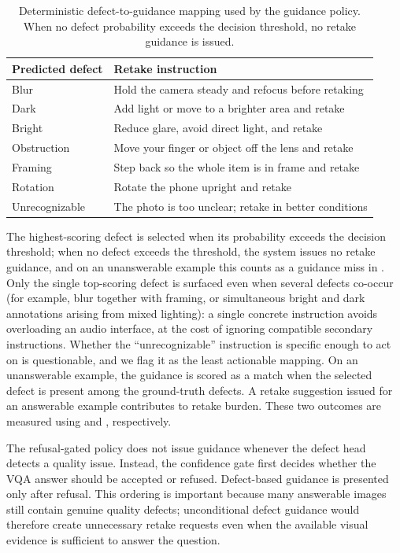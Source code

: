 \documentclass{ieeeaccess}
\newcommand{\arr}{\mathrm{GDMR}}
\newcommand{\frr}{\mathrm{AIRB}}
\begin{document}
\begin{table}[t]
    \centering
    \caption{Deterministic defect-to-guidance mapping used by the
    guidance policy. When no defect probability exceeds the
    decision threshold, no retake guidance is issued.}
    \label{tab:defect_guidance}
    \small
    \begin{tabular}{ll}
        \toprule
        Predicted defect & Retake instruction \\
        \midrule
        Blur & Hold the camera steady and refocus before retaking \\
        Dark & Add light or move to a brighter area and retake \\
        Bright & Reduce glare, avoid direct light, and retake \\
        Obstruction & Move your finger or object off the lens and retake \\
        Framing & Step back so the whole item is in frame and retake \\
        Rotation & Rotate the phone upright and retake \\
        Unrecognizable & The photo is too unclear; retake in better conditions \\
        \bottomrule
    \end{tabular}
\end{table}

The highest-scoring defect is selected when its probability
exceeds the decision threshold; when no defect exceeds the
threshold, the system issues no retake guidance, and on an
unanswerable example this counts as a guidance miss in \arr{}.
Only the single top-scoring defect is surfaced even when several
defects co-occur (for example, blur together with framing, or
simultaneous bright and dark annotations arising from mixed
lighting): a single concrete instruction avoids overloading an
audio interface, at the cost of ignoring compatible secondary
instructions. Whether the ``unrecognizable'' instruction is
specific enough to act on is questionable, and we flag it as the
least actionable mapping. On an unanswerable example, the
guidance is scored as a match when the selected defect is present
among the ground-truth defects. A retake suggestion issued for an
answerable example contributes to retake burden. These two
outcomes are measured using \arr{} and \frr{}, respectively.

The refusal-gated policy does not issue guidance whenever the
defect head detects a quality issue. Instead, the confidence gate
first decides whether the VQA answer should be accepted or
refused. Defect-based guidance is presented only after refusal.
This ordering is important because many answerable images still
contain genuine quality defects; unconditional defect guidance
would therefore create unnecessary retake requests even when the
available visual evidence is sufficient to answer the question.
\end{document}
